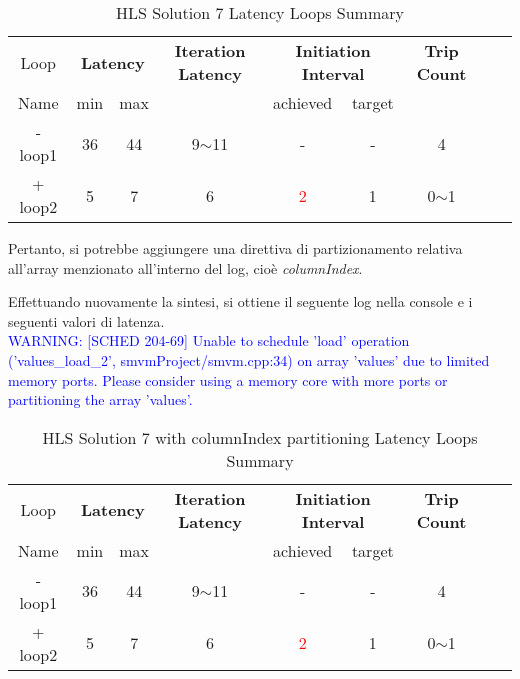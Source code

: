 \begin{table}[H]
	\centering
	\begin{tabular}{|c|c|c|c|c|c|c|c|c|}
		\hline
		\multicolumn{1}{|c|}{Loop} & \multicolumn{2}{|c|}{\textbf{Latency}} & \multicolumn{1}{c|}{\textbf{Iteration Latency}} & \multicolumn{2}{c|}{\textbf{Initiation Interval}} & \multicolumn{1}{c|}{\textbf{Trip Count}}  \\
		Name & min & max &  & achieved & target &  \\
		\hline
		- loop1 & 36 & 44 & 9$\sim$11 & - & - & 4 \\
		+ loop2 & 5 & 7 & 6 & \textcolor{red}{2} & 1 & 0$\sim$1 \\
		\hline
	\end{tabular}
	\caption{HLS Solution 7 Latency Loops Summary}
	\label{tab:hls-solution-7-loop-summary}
\end{table}

Pertanto, si potrebbe aggiungere una direttiva di partizionamento relativa all'array menzionato all'interno del log, cioè \textit{columnIndex}.



Effettuando nuovamente la sintesi, si ottiene il seguente log nella console e i seguenti valori di latenza.
\\
\textcolor{blue}{WARNING: [SCHED 204-69] Unable to schedule 'load' operation ('values\_load\_2', smvmProject/smvm.cpp:34) on array 'values' due to limited memory ports. Please consider using a memory core with more ports or partitioning the array 'values'.}

\begin{table}[H]
	\centering
	\begin{tabular}{|c|c|c|c|c|c|c|c|c|}
		\hline
		\multicolumn{1}{|c|}{Loop} & \multicolumn{2}{|c|}{\textbf{Latency}} & \multicolumn{1}{c|}{\textbf{Iteration Latency}} & \multicolumn{2}{c|}{\textbf{Initiation Interval}} & \multicolumn{1}{c|}{\textbf{Trip Count}}  \\
		Name & min & max &  & achieved & target &  \\
		\hline
		- loop1 & 36 & 44 & 9$\sim$11 & - & - & 4 \\
		+ loop2 & 5 & 7 & 6 & \textcolor{red}{2} & 1 & 0$\sim$1 \\
		\hline
	\end{tabular}
	\caption{HLS Solution 7 with columnIndex partitioning Latency Loops Summary}
	\label{tab:hls-solution-7-columnindex-partitioning-loop-summary}
\end{table}

